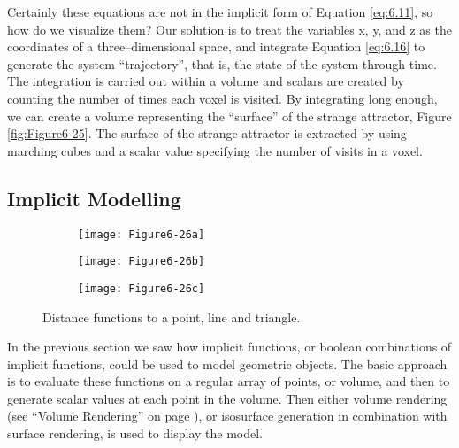 Certainly these equations are not in the implicit form of Equation \ref{eq:6.11}, so how do we visualize them? Our solution is to treat the variables x, y, and z as the coordinates of a three--dimensional space, and integrate Equation \ref{eq:6.16} to generate the system ``trajectory'', that is, the state of the system through time. The integration is carried out within a volume and scalars are created by counting the number of times each voxel is visited. By integrating long enough, we can create a volume representing the ``surface'' of the strange attractor, Figure \ref{fig:Figure6-25}. The surface of the strange attractor is extracted by using marching cubes and a scalar value specifying the number of visits in a voxel.


\subsection{Implicit Modelling}
\label{subsec:implicit_modelling}

\begin{figure}[htb]
	\begin{subfigure}[h]{0.24\linewidth}
		\texttt{[image: Figure6-26a]}
		\label{fig:Figure6-26a}
	\end{subfigure}
	\hfill
	\begin{subfigure}[h]{0.24\linewidth}
		\texttt{[image: Figure6-26b]}
		\label{fig:Figure6-26b}
	\end{subfigure}
	\hfill
	\begin{subfigure}[h]{0.24\linewidth}
		\texttt{[image: Figure6-26c]}
		\label{fig:Figure6-26c}
	\end{subfigure}
	\caption{Distance functions to a point, line and triangle.}\label{fig:Figure6-26}
\end{figure}

In the previous section we saw how implicit functions, or boolean combinations of implicit functions, could be used to model geometric objects. The basic approach is to evaluate these functions on a regular array of points, or volume, and then to generate scalar values at each point in the volume. Then either volume rendering (see ``Volume Rendering'' on page \pageref{sec:volume_rendering} ), or isosurface generation in combination with surface rendering, is used to display the model.

